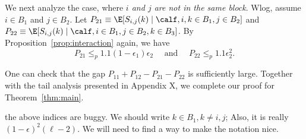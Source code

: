 We next analyze the case, where \emph{$i$ and $j$ are not in the same block}.  Wlog, assume $i \in B_1 $ and $j \in B_2$. Let $P_{21} \equiv \E[S_{i,j}(k)\mid \calf,i,k\in B_1,j\in B_2]$ and $P_{22} \equiv \E[S_{i,j}(k)\mid \calf, i\in B_1,j\in B_2,k \in B_3]$. By Proposition~\ref{prop:interaction} again, we have 
\begin{equation}
    P_{21} \leq_p 1.1(1-\epsilon_1)\epsilon_2 \quad \mbox{ and } \quad 
    P_{22} \leq_p 1.1 \epsilon^2_2. 
\end{equation}

One can check that the gap $P_{11} + P_{12} - P_{21} - P_{22}$ is sufficiently large. Together with the tail analysis presented in {\color{red} Appendix X}, we complete our proof for Theorem~\ref{thm:main}.

{\color{blue} the above indices are buggy. We should write $k \in B_1, k\neq i,j$; Also, it is really $(1-\epsilon)^2 (\ell-2)$. We will need to find a way to make the notation nice. }

